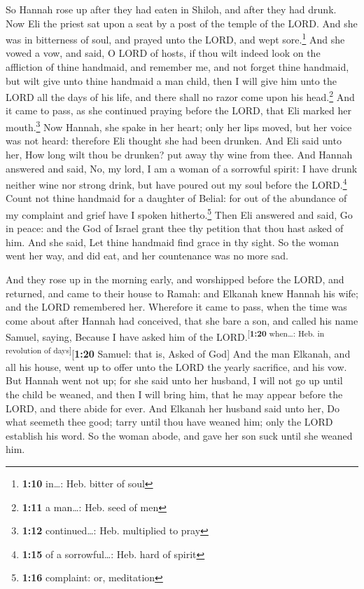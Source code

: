  So Hannah rose up after they had eaten in Shiloh, and
after they had drunk. Now Eli the priest sat upon a seat by a post of
the temple of the LORD.  And she was in bitterness of
soul, and prayed unto the LORD, and wept sore.\footnote{\textbf{1:10}
  in\ldots: Heb. bitter of soul}  And she vowed a vow,
and said, O LORD of hosts, if thou wilt indeed look on the affliction of
thine handmaid, and remember me, and not forget thine handmaid, but wilt
give unto thine handmaid a man child, then I will give him unto the LORD
all the days of his life, and there shall no razor come upon his
head.\footnote{\textbf{1:11} a man\ldots: Heb. seed of men}
 And it came to pass, as she continued praying before the
LORD, that Eli marked her mouth.\footnote{\textbf{1:12} continued\ldots:
  Heb. multiplied to pray}  Now Hannah, she spake in her
heart; only her lips moved, but her voice was not heard: therefore Eli
thought she had been drunken.  And Eli said unto her, How
long wilt thou be drunken? put away thy wine from thee. 
And Hannah answered and said, No, my lord, I am a woman of a sorrowful
spirit: I have drunk neither wine nor strong drink, but have poured out
my soul before the LORD.\footnote{\textbf{1:15} of a sorrowful\ldots:
  Heb. hard of spirit}  Count not thine handmaid for a
daughter of Belial: for out of the abundance of my complaint and grief
have I spoken hitherto.\footnote{\textbf{1:16} complaint: or, meditation}
 Then Eli answered and said, Go in peace: and the God of
Israel grant thee thy petition that thou hast asked of him.
 And she said, Let thine handmaid find grace in thy
sight. So the woman went her way, and did eat, and her countenance was
no more sad.

 And they rose up in the morning early, and worshipped
before the LORD, and returned, and came to their house to Ramah: and
Elkanah knew Hannah his wife; and the LORD remembered her.
 Wherefore it came to pass, when the time was come about
after Hannah had conceived, that she bare a son, and called his name
Samuel, saying, Because I have asked him of the
LORD.\textsuperscript{{[}\textbf{1:20} when\ldots: Heb. in revolution of
days{]}}{[}\textbf{1:20} Samuel: that is, Asked of God{]}
 And the man Elkanah, and all his house, went up to offer
unto the LORD the yearly sacrifice, and his vow.  But
Hannah went not up; for she said unto her husband, I will not go up
until the child be weaned, and then I will bring him, that he may appear
before the LORD, and there abide for ever.  And Elkanah
her husband said unto her, Do what seemeth thee good; tarry until thou
have weaned him; only the LORD establish his word. So the woman abode,
and gave her son suck until she weaned him.

